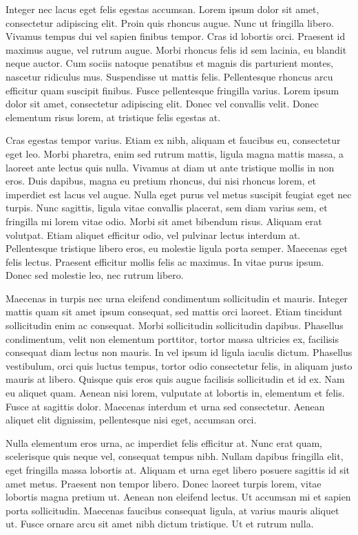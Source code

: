 Integer nec lacus eget felis egestas accumsan. Lorem ipsum dolor sit amet, consectetur adipiscing elit. Proin quis rhoncus augue. Nunc ut fringilla libero. Vivamus tempus dui vel sapien finibus tempor. Cras id lobortis orci. Praesent id maximus augue, vel rutrum augue. Morbi rhoncus felis id sem lacinia, eu blandit neque auctor. Cum sociis natoque penatibus et magnis dis parturient montes, nascetur ridiculus mus. Suspendisse ut mattis felis. Pellentesque rhoncus arcu efficitur quam suscipit finibus. Fusce pellentesque fringilla varius. Lorem ipsum dolor sit amet, consectetur adipiscing elit. Donec vel convallis velit. Donec elementum risus lorem, at tristique felis egestas at.

Cras egestas tempor varius. Etiam ex nibh, aliquam et faucibus eu, consectetur eget leo. Morbi pharetra, enim sed rutrum mattis, ligula magna mattis massa, a laoreet ante lectus quis nulla. Vivamus at diam ut ante tristique mollis in non eros. Duis dapibus, magna eu pretium rhoncus, dui nisi rhoncus lorem, et imperdiet est lacus vel augue. Nulla eget purus vel metus suscipit feugiat eget nec turpis. Nunc sagittis, ligula vitae convallis placerat, sem diam varius sem, et fringilla mi lorem vitae odio. Morbi sit amet bibendum risus. Aliquam erat volutpat. Etiam aliquet efficitur odio, vel pulvinar lectus interdum at. Pellentesque tristique libero eros, eu molestie ligula porta semper. Maecenas eget felis lectus. Praesent efficitur mollis felis ac maximus. In vitae purus ipsum. Donec sed molestie leo, nec rutrum libero.

Maecenas in turpis nec urna eleifend condimentum sollicitudin et mauris. Integer mattis quam sit amet ipsum consequat, sed mattis orci laoreet. Etiam tincidunt sollicitudin enim ac consequat. Morbi sollicitudin sollicitudin dapibus. Phasellus condimentum, velit non elementum porttitor, tortor massa ultricies ex, facilisis consequat diam lectus non mauris. In vel ipsum id ligula iaculis dictum. Phasellus vestibulum, orci quis luctus tempus, tortor odio consectetur felis, in aliquam justo mauris at libero. Quisque quis eros quis augue facilisis sollicitudin et id ex. Nam eu aliquet quam. Aenean nisi lorem, vulputate at lobortis in, elementum et felis. Fusce at sagittis dolor. Maecenas interdum et urna sed consectetur. Aenean aliquet elit dignissim, pellentesque nisi eget, accumsan orci.

Nulla elementum eros urna, ac imperdiet felis efficitur at. Nunc erat quam, scelerisque quis neque vel, consequat tempus nibh. Nullam dapibus fringilla elit, eget fringilla massa lobortis at. Aliquam et urna eget libero posuere sagittis id sit amet metus. Praesent non tempor libero. Donec laoreet turpis lorem, vitae lobortis magna pretium ut. Aenean non eleifend lectus. Ut accumsan mi et sapien porta sollicitudin. Maecenas faucibus consequat ligula, at varius mauris aliquet ut. Fusce ornare arcu sit amet nibh dictum tristique. Ut et rutrum nulla.

